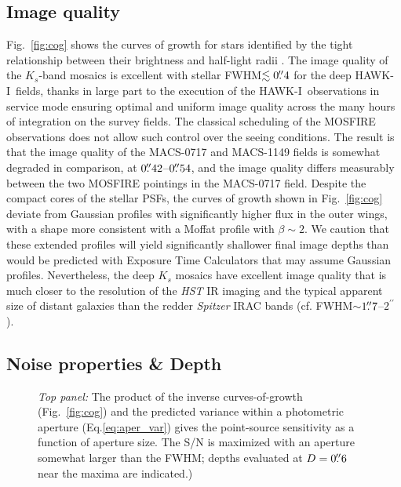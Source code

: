 \documentclass[preprint2]{aastex6}
\gdef\HAWKI{\mbox{HAWK-I}}
\begin{document}
\subsection{Image quality}
\label{s:fwhm}



Fig.~\ref{fig:cog} shows the curves of growth for stars identified by the tight relationship between their brightness and half-light radii \citep[see, e.g., Fig.~13 of][]{skelton:14}.  The image quality of the $K_s$-band mosaics is excellent with stellar FWHM$\lesssim0\mbox{$.\!\!^{\prime\prime}$}4$ for the deep \HAWKI\ fields, thanks in large part to the execution of the \HAWKI\ observations in service mode ensuring optimal and uniform image quality across the many hours of integration on the survey fields.  The classical scheduling of the MOSFIRE observations does not allow such control over the seeing conditions.  The result is that the image quality of the MACS-0717 and MACS-1149 fields is somewhat degraded in comparison, at $0\mbox{$.\!\!^{\prime\prime}$}42$--$0\mbox{$.\!\!^{\prime\prime}$}54$, and the image quality differs measurably between the two MOSFIRE pointings in the MACS-0717 field.  Despite the compact cores of the stellar PSFs, the curves of growth shown in Fig.~\ref{fig:cog} deviate from Gaussian profiles with significantly higher flux in the outer wings, with a shape more consistent with a Moffat profile \citep{trujillo:01}  with $\beta\sim2$.  We caution that these extended profiles will yield significantly shallower final image depths than would be predicted with Exposure Time Calculators that may assume Gaussian profiles.  Nevertheless, the deep $K_s$ mosaics have excellent image quality that is much closer to the resolution of the \textit{HST} IR imaging and the typical apparent size of distant galaxies \citep[median $r_e\sim0\farcs1$--$0\farcs2$ at $z>4$;][]{shibuya:15} than the redder \textit{Spitzer} IRAC bands (cf. FWHM$\sim$$1\mbox{$.\!\!^{\prime\prime}$}7$--$2^{\prime\prime}$).

\subsection{Noise properties \& Depth}
\label{s:depth}

\begin{figure}[!t]
\caption{\textit{Top panel:} The product of the inverse curves-of-growth (Fig.~\ref{fig:cog}) and the predicted variance within a photometric aperture (Eq.\ref{eq:aper_var}) gives the point-source sensitivity as a function of aperture size.  The S/N is maximized with an aperture somewhat larger than the FWHM; depths evaluated at $D=0\mbox{$.\!\!^{\prime\prime}$}6$ near the maxima are indicated.)
\label{fig:depth}}  
\end{figure}
\end{document}
